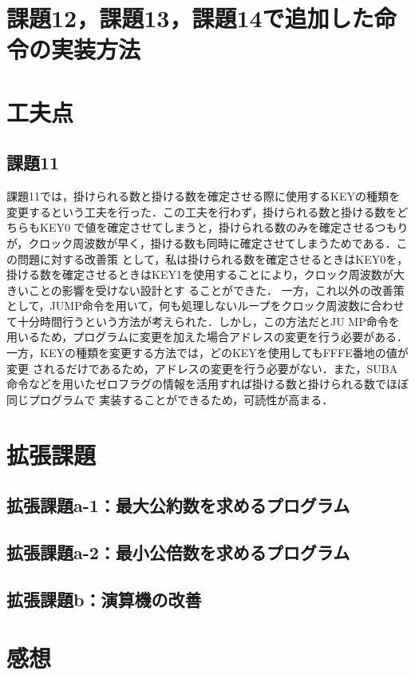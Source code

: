 \documentclass[dvipdfmx]{jarticle}
\begin{document}
\section{課題12，課題13，課題14で追加した命令の実装方法}
\section{工夫点}
\subsection{課題11}
課題11では，掛けられる数と掛ける数を確定させる際に使用するKEYの種類を変更するという工夫を行った．この工夫を行わず，掛けられる数と掛ける数をどちらもKEY0
で値を確定させてしまうと，掛けられる数のみを確定させるつもりが，クロック周波数が早く，掛ける数も同時に確定させてしまうためである．この問題に対する改善策
として，私は掛けられる数を確定させるときはKEY0を，掛ける数を確定させるときはKEY1を使用することにより，クロック周波数が大きいことの影響を受けない設計とす
ることができた．
一方，これ以外の改善策として，JUMP命令を用いて，何も処理しないループをクロック周波数に合わせて十分時間行うという方法が考えられた．しかし，この方法だとJU
MP命令を用いるため，プログラムに変更を加えた場合アドレスの変更を行う必要がある．一方，KEYの種類を変更する方法では，どのKEYを使用してもFFFE番地の値が変更
されるだけであるため，アドレスの変更を行う必要がない．また，SUBA命令などを用いたゼロフラグの情報を活用すれば掛ける数と掛けられる数でほぼ同じプログラムで
実装することができるため，可読性が高まる．
\section{拡張課題}
\subsection{拡張課題a-1：最大公約数を求めるプログラム}
\subsection{拡張課題a-2：最小公倍数を求めるプログラム}
\subsection{拡張課題b：演算機の改善}
\section{感想}
\end{document}
